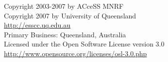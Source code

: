 



\begin{center}
           Copyright 2003-2007 by ACceSS MNRF \\
           Copyright 2007 by University of Queensland \\
               \url{http://esscc.uq.edu.au} \\
         Primary Business: Queensland, Australia \\
   Licensed under the Open Software License version 3.0 \\
      \url{http://www.opensource.org/licenses/osl-3.0.php} \\
\end{center}
